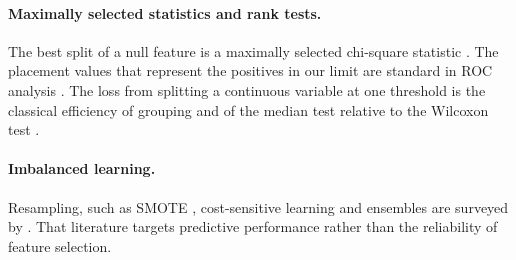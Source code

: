 \paragraph{Maximally selected statistics and rank tests.} The best split of a null feature is a maximally selected chi-square statistic \citep{miller1982maximally,lausen1992maximally,hothorn2003exact,hothorn2008generalized}. The placement values that represent the positives in our limit are standard in ROC analysis \citep{hanley1982meaning,delong1988comparing,pepe2004placement}. The loss from splitting a continuous variable at one threshold is the classical efficiency of grouping \citep{cox1957note} and of the median test relative to the Wilcoxon test \citep{mood1954asymptotic,mann1947test,hodges1956efficiency}.

\paragraph{Imbalanced learning.} Resampling, such as SMOTE \citep{chawla2002smote}, cost-sensitive learning and ensembles are surveyed by \citet{fernandez2018learning}. That literature targets predictive performance rather than the reliability of feature selection.
